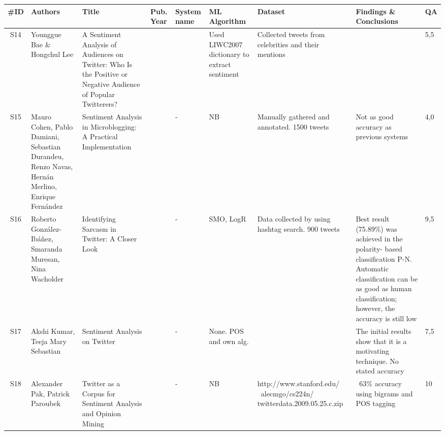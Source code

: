 \addtocounter{table}{-1}

\begin{sidewaystable}
    \centering
	\caption{Data extraction step, table 3/4. Showing data as per defined in the SLRP in appendix~\autoref{apx:slrp}}
    \label{tab:extraction3}
    \scriptsize
    \begin{longtable}{|c|p{2.5cm}|p{4cm}|p{0.6cm}|p{1cm}|p{1.3cm}|p{4cm}|p{3cm}|p{0.3cm}|} 
        
    \hline
    \textbf{\#ID} & \textbf{Authors} & \textbf{Title} & \textbf{Pub. Year} & \textbf{System name} & \textbf{ML Algorithm} & \textbf{Dataset} & \textbf{Findings} \& \textbf{Conclusions} & \textbf{QA} \\ 
    \hline

    
    S14 & Younggue Bae \& Hongchul Lee & A Sentiment Analysis of Audiences on Twitter: Who Is the Positive or Negative Audience of Popular Twitterers? & \citeyear{bae2011sentiment} &  & Used LIWC2007 dictionary to extract sentiment & Collected tweets from celebrities and their mentions & & 5,5  \\ \hline  
    
    S15 & Mauro Cohen, Pablo Damiani, Sebastian Durandeu, Renzo Navas, Hern\'{a}n Merlino, Enrique Fern\'{a}ndez & Sentiment Analysis in Microblogging: A Practical Implementation & \citeyear{cohen2011sentiment} & - & NB & Manually gathered and annotated. 1500 tweets & Not as good accuracy as previous systems & 4,0 \\ \hline  
    
    S16 & Roberto Gonz\'{a}lez-Ib\'{a}\~{n}ez, Smaranda Muresan, Nina Wacholder & Identifying Sarcasm in Twitter: A Closer Look & \citeyear{gonzalez2011identifying} & - & SMO, LogR & Data collected by using hashtag search. 900 tweets & Best result (75.89\%) was achieved in the polarity- based classification P-N. Automatic classification can be as good as human classification; however, the accuracy is still low & 9,5 \\ \hline  
    
    S17 & Akshi Kumar, Teeja Mary Sebastian & Sentiment Analysis on Twitter & \citeyear{kumar2012sentiment} & - & None. POS and own alg. &  & The initial results show that it is a motivating technique. No stated accuracy & 7,5 \\ \hline  
    
    S18 & Alexander Pak, Patrick Paroubek & Twitter as a Corpus for Sentiment Analysis and Opinion Mining & \citeyear{article:pak} & - & NB & http://www.stanford.edu/ ~alecmgo/cs224n/ twitterdata.2009.05.25.c.zip & ~63\% accuracy using bigrams and POS tagging & 10 \\ \hline  
    

    
    
    \end{longtable}
\end{sidewaystable}

